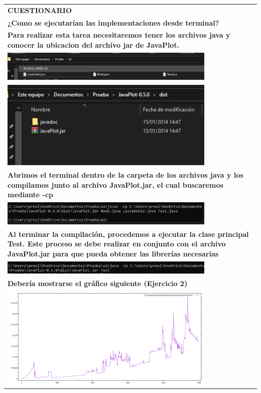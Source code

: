 \documentclass[9pt]{article}
\begin{document}
\begin{longtable}{|p{15cm}|}
		\textbf{CUESTIONARIO}\\
		\textbf{¿Como se ejecutarían las implementaciones desde terminal?}\\
		\textbf{Para realizar esta tarea necesitaremos tener los archivos java y conocer la ubicacion del archivo jar de JavaPlot.}\\
		\includegraphics[width=0.8\textwidth,keepaspectratio]{img/java.png}\\
		\includegraphics[width=0.8\textwidth,keepaspectratio]{img/javaplot.png}\\
		\textbf{Abrimos el terminal dentro de la carpeta de los archivos java y los compilamos junto al archivo JavaPlot.jar, el cual buscaremos mediante -cp}\\
		\includegraphics[width=0.8\textwidth,keepaspectratio]{img/compilar.png}\\
		\textbf{Al terminar la compilación, procedemos a ejecutar la clase principal Test. Este proceso se debe realizar en conjunto con el archivo JavaPlot.jar para que pueda obtener las librerías necesarias}\\
		\includegraphics[width=0.8\textwidth,keepaspectratio]{img/ejecutamos.png}\\
		\textbf{Debería mostrarse el gráfico siguiente (Ejercicio 2)}\\
		\includegraphics[width=0.8\textwidth,keepaspectratio]{img/grafico1.png}\\
		
		\hline
	\end{longtable}
\end{document}
